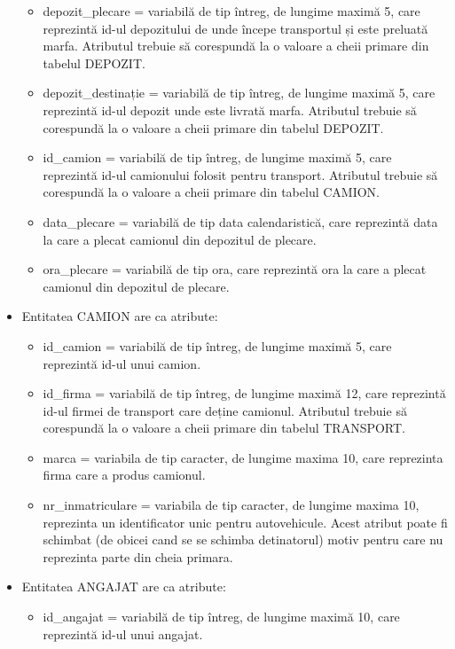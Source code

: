 \documentclass[12pt, a4paper]{article}
\begin{document}
\begin{itemize}
\begin{itemize}
            \item depozit\_plecare = variabilă de tip întreg, de lungime maximă 5, care reprezintă id-ul depozitului de unde începe transportul și este preluată marfa. Atributul trebuie să corespundă la o valoare a cheii primare din tabelul DEPOZIT.
            \item depozit\_destinație = variabilă de tip întreg, de lungime maximă 5, care reprezintă id-ul depozit unde este livrată marfa. Atributul trebuie să corespundă la o valoare a cheii primare din tabelul DEPOZIT.
            \item id\_camion = variabilă de tip întreg, de lungime maximă 5, care reprezintă id-ul camionului folosit pentru transport. Atributul trebuie să corespundă la o valoare a cheii primare din tabelul CAMION.
            \item data\_plecare = variabilă de tip data calendaristică, care reprezintă data la care a plecat camionul din depozitul de plecare.
            \item ora\_plecare = variabilă de tip ora, care reprezintă ora la care a plecat camionul din depozitul de plecare.
        \end{itemize}
    \item Entitatea CAMION are ca atribute:
        \begin{itemize}
            \item id\_camion = variabilă de tip întreg, de lungime maximă 5, care reprezintă id-ul unui camion.
            \item id\_firma = variabilă de tip întreg, de lungime maximă 12, care reprezintă id-ul firmei de transport care deține camionul. Atributul trebuie să corespundă la o valoare a cheii primare din tabelul TRANSPORT.
            \item marca = variabila de tip caracter, de lungime maxima 10, care reprezinta firma care a produs camionul.
            \item nr\_inmatriculare = variabila de tip caracter, de lungime maxima 10, reprezinta un identificator unic pentru autovehicule. Acest atribut poate fi schimbat (de obicei cand se se schimba detinatorul) motiv pentru care nu reprezinta parte din cheia primara.
        \end{itemize}
    \item Entitatea ANGAJAT are ca atribute:
        \begin{itemize}
            \item id\_angajat = variabilă de tip întreg, de lungime maximă 10, care reprezintă id-ul unui angajat.

\end{itemize}
\end{itemize}
\end{document}
